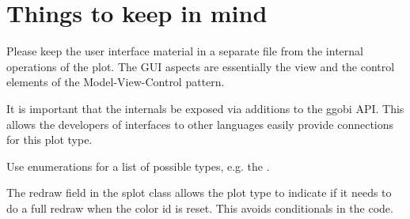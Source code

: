 \documentclass{article}
\begin{document}
\section{Things to keep in mind}


Please keep the user interface material in a separate file from the
internal operations of the plot.  The GUI aspects are essentially the
view and the control elements of the Model-View-Control
pattern\cite{DesignPatterns}.

It is important that the internals be exposed via additions to the
ggobi API. This allows the developers of interfaces to other languages
easily provide connections for this plot type.

Use enumerations for a list of possible types,
e.g. the .


The redraw field in the splot class allows the plot type to indicate
if it needs to do a full redraw when the color id is reset.
This avoids conditionals in the code.
\end{document}
